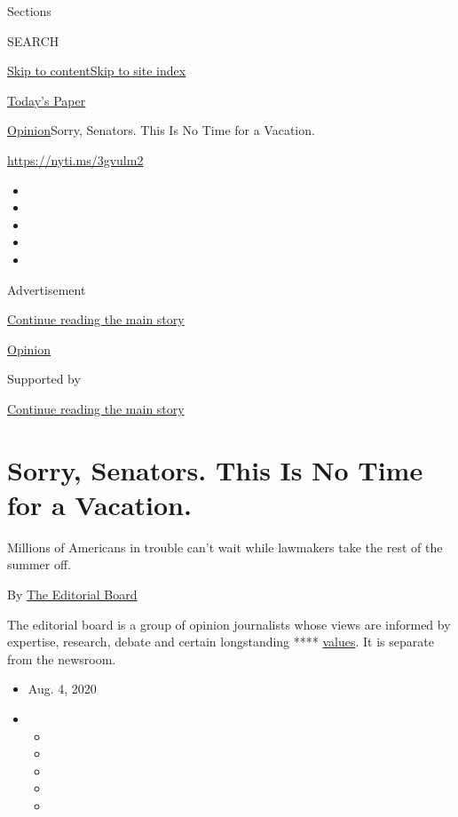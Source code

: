 Sections

SEARCH

\protect\hyperlink{site-content}{Skip to
content}\protect\hyperlink{site-index}{Skip to site index}

\href{https://myaccount.nytimes.com/auth/login?response_type=cookie\&client_id=vi}{}

\href{https://www.nytimes.com/section/todayspaper}{Today's Paper}

\href{/section/opinion}{Opinion}\textbar{}Sorry, Senators. This Is No
Time for a Vacation.

\href{https://nyti.ms/3gvulm2}{https://nyti.ms/3gvulm2}

\begin{itemize}
\item
\item
\item
\item
\item
\end{itemize}

Advertisement

\protect\hyperlink{after-top}{Continue reading the main story}

\href{/section/opinion}{Opinion}

Supported by

\protect\hyperlink{after-sponsor}{Continue reading the main story}

\hypertarget{sorry-senators-this-is-no-time-for-a-vacation}{%
\section{Sorry, Senators. This Is No Time for a
Vacation.}\label{sorry-senators-this-is-no-time-for-a-vacation}}

Millions of Americans in trouble can't wait while lawmakers take the
rest of the summer off.

By
\href{https://www.nytimes.com/interactive/opinion/editorialboard.html}{The
Editorial Board}

The editorial board is a group of opinion journalists whose views are
informed by expertise, research, debate and certain longstanding ****
\href{https://www.nytimes.com/interactive/2018/opinion/editorialboard.html}{values}.
It is separate from the newsroom.

\begin{itemize}
\item
  Aug. 4, 2020
\item
  \begin{itemize}
  \item
  \item
  \item
  \item
  \item
  \end{itemize}
\end{itemize}

